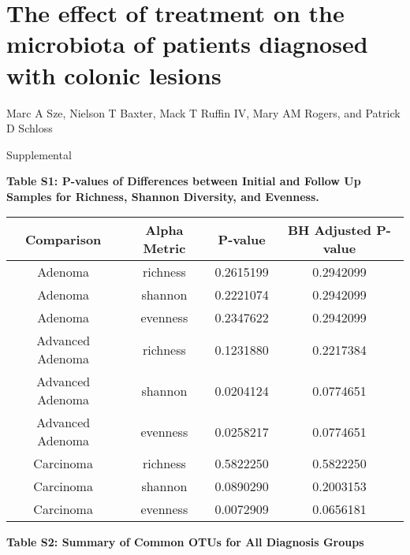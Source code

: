 \documentclass[12pt,]{article}
\title{}
\author{}
\date{}
\begin{document}
\section{The effect of treatment on the microbiota of patients diagnosed
with colonic
lesions}\label{the-effect-of-treatment-on-the-microbiota-of-patients-diagnosed-with-colonic-lesions}

\vspace{10mm}

\begin{center}
Marc A Sze, Nielson T Baxter, Mack T Ruffin IV, Mary AM Rogers, and Patrick D Schloss

\vspace{10mm}

Supplemental
\end{center}

\newpage

\textbf{Table S1: P-values of Differences between Initial and Follow Up
Samples for Richness, Shannon Diversity, and Evenness.}

\begin{longtable}[]{@{}cccc@{}}
\toprule
Comparison & Alpha Metric & P-value & BH Adjusted P-value\tabularnewline
\midrule
\endhead
Adenoma & richness & 0.2615199 & 0.2942099\tabularnewline
Adenoma & shannon & 0.2221074 & 0.2942099\tabularnewline
Adenoma & evenness & 0.2347622 & 0.2942099\tabularnewline
Advanced Adenoma & richness & 0.1231880 & 0.2217384\tabularnewline
Advanced Adenoma & shannon & 0.0204124 & 0.0774651\tabularnewline
Advanced Adenoma & evenness & 0.0258217 & 0.0774651\tabularnewline
Carcinoma & richness & 0.5822250 & 0.5822250\tabularnewline
Carcinoma & shannon & 0.0890290 & 0.2003153\tabularnewline
Carcinoma & evenness & 0.0072909 & 0.0656181\tabularnewline
\bottomrule
\end{longtable}

\newpage

\newcommand{\blandscape}{\begin{landscape}}
\newcommand{\elandscape}{\end{landscape}}

\textbf{Table S2: Summary of Common OTUs for All Diagnosis Groups}

\footnotesize
\end{document}
